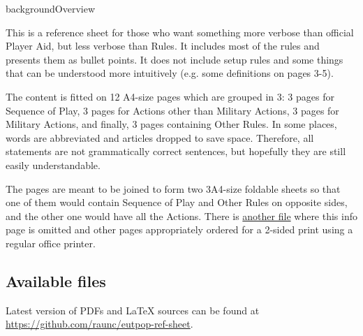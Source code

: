 \documentclass[10pt]{article}
\begin{document}
\thispagestyle{empty}
\ifrenderbw
\else
  \begin{staticcontents*}{backgroundOverview}
  \end{staticcontents*}
\fi


This is a reference sheet for those who want something more verbose than official Player Aid,
but less verbose than Rules.
It includes most of the rules and presents them as bullet points.
It does not include setup rules and some things that can be understood more intuitively (e.g. some definitions on pages 3-5).


The content is fitted on 12 A4-size pages which are grouped in 3:
3 pages for Sequence of Play, 3 pages for Actions other than Military Actions,
3 pages for Military Actions, and finally, 3 pages containing Other Rules.
In some places, words are abbreviated and articles dropped to save space.
Therefore, all statements are not grammatically correct sentences, but hopefully they are still easily understandable.


The pages are meant to be joined to form two 3\texttimes A4-size foldable sheets so that
one of them would contain Sequence of Play and Other Rules on opposite sides,
and the other one would have all the Actions.
There is \href{https://github.com/raunc/eutpop-ref-sheet/blob/main/pdf/eutpop\_ref\_sheet\_print\_2\_sided.pdf}{another file}
where this info page is omitted and other pages appropriately ordered for a 2-sided print using a regular office printer.


\subsection*{Available files}

Latest version of PDFs and \LaTeX\xspace sources can be found at \href{https://github.com/raunc/eutpop-ref-sheet}{https://github.com/raunc/eutpop-ref-sheet}.
\end{document}
